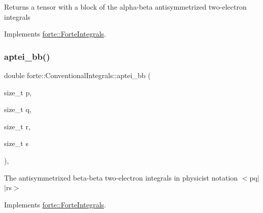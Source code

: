 \begin{DoxyReturn}{Returns}
a tensor with a block of the alpha-\/beta antisymmetrized two-\/electron integrals 
\end{DoxyReturn}


Implements \mbox{\hyperlink{classforte_1_1_forte_integrals_acd40e350dc861baf8adf6a3b47c74023}{forte\+::\+Forte\+Integrals}}.

\mbox{\label{classforte_1_1_conventional_integrals_ae6d6bfe97bb42d74dc9b69b5c617a966}} 
\subsubsection{\texorpdfstring{aptei\+\_\+bb()}{aptei\_bb()}}
{\footnotesize\ttfamily double forte\+::\+Conventional\+Integrals\+::aptei\+\_\+bb (\begin{DoxyParamCaption}\item[{size\+\_\+t}]{p,  }\item[{size\+\_\+t}]{q,  }\item[{size\+\_\+t}]{r,  }\item[{size\+\_\+t}]{s }\end{DoxyParamCaption})\hspace{0.3cm}{\ttfamily [override]}, {\ttfamily [virtual]}}



The antisymmetrixed beta-\/beta two-\/electron integrals in physicist notation $<$pq$\vert$$\vert$rs$>$ 



Implements \mbox{\hyperlink{classforte_1_1_forte_integrals_a246225031c3799dc446f94e0e732c3ac}{forte\+::\+Forte\+Integrals}}.

\mbox{\label{classforte_1_1_conventional_integrals_a85a995f80f256953f9ceeb2ea903cf0b}} 
